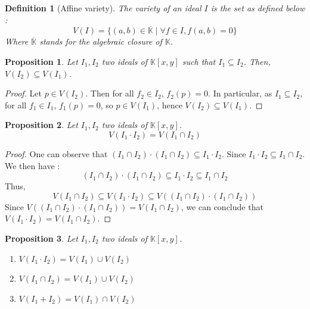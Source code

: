 \documentclass{article}
\newtheorem{definition}{Definition}[section]
\newtheorem{proposition}{Proposition}[section]
\begin{document}
\begin{definition} [Affine variety]
    The variety of an ideal $I$ is the set as defined below : 
    \begin{displaymath}
        V(I) = \{ (a, b) \in \overline{\mathbb{K}} \mid \forall f \in I, f(a, b) = 0 \}
    \end{displaymath}
    Where $\overline{\mathbb{K}}$ stands for the algebraic closure of $\mathbb{K}$. 
\end{definition}

\begin{proposition}
    Let $I_{1}, I_{2}$ two ideals of $\mathbb{K}[x, y]$ such that $I_{1} \subseteq I_{2}$. Then, $V(I_{2}) \subseteq V(I_{1})$.
\end{proposition}

\begin{proof}
    Let $p \in V(I_{2})$. Then for all $f_{2} \in I_{2}$, $f_{2}(p) = 0$. In particular, as $I_{1} \subseteq I_{2}$, for all $f_{1} \in I_{1}$, $f_{1}(p) = 0$, so $p \in V(I_{1})$, hence $V(I_{2}) \subseteq V(I_{1})$.
\end{proof}

\begin{proposition}
    Let $I_{1}, I_{2}$ two ideals of $\mathbb{K}[x, y]$. 
    \begin{displaymath}
        V(I_{1} \cdot I_{2}) = V(I_{1} \cap I_{2})
    \end{displaymath}
\end{proposition}

\begin{proof}
    One can observe that $(I_{1} \cap I_{2}) \cdot (I_{1} \cap I_{2}) \subseteq I_{1} \cdot I_{2}$. Since $I_{1} \cdot I_{2} \subseteq I_{1} \cap I_{2}$. We then have : 
    \begin{displaymath}
        (I_{1} \cap I_{2}) \cdot (I_{1} \cap I_{2}) \subseteq I_{1} \cdot I_{2} \subseteq I_{1} \cap I_{2}
    \end{displaymath}
    Thus, 
    \begin{displaymath}
        V(I_{1} \cap I_{2}) \subseteq V(I_{1} \cdot I_{2}) \subseteq V((I_{1} \cap I_{2}) \cdot (I_{1} \cap I_{2}))
    \end{displaymath}
    Since $V((I_{1} \cap I_{2}) \cdot (I_{1} \cap I_{2})) = V(I_{1} \cap I_{2})$, we can conclude that $V(I_{1} \cdot I_{2}) = V(I_{1} \cap I_{2})$.
\end{proof}

\begin{proposition}
    Let $I_{1}, I_{2}$ two ideals of $\mathbb{K}[x, y]$. 
    \begin{enumerate}
        \item[(i)] $V(I_{1} \cdot I_{2}) = V(I_{1}) \cup V(I_{2})$
        \item[(ii)] $V(I_{1} \cap I_{2}) = V(I_{1}) \cup V(I_{2})$
        \item[(iii)] $V(I_{1} + I_{2}) = V(I_{1}) \cap V(I_{2})$
    \end{enumerate}
\end{proposition}
    
\end{document}
